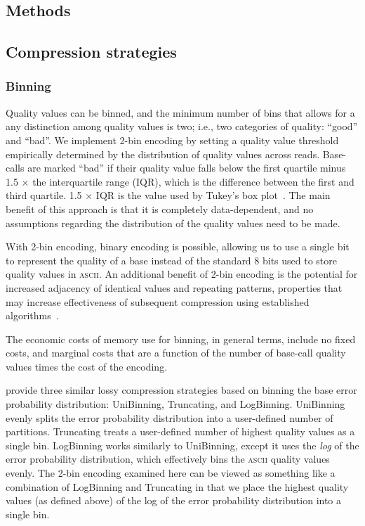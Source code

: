 \documentclass{bioinfo}
\begin{document}
\begin{methods}
\section{Methods}

\subsection{Compression strategies}

\subsubsection{Binning}

Quality values can be binned, and the minimum number of bins that
allows for a any distinction among quality values is two; i.e., two
categories of quality: ``good'' and ``bad''. We implement 2-bin
encoding by setting a quality value threshold empirically determined
by the distribution of quality values across reads. Base-calls are
marked ``bad'' if their quality value falls below the first quartile
minus 1.5 $\times$ the interquartile range (IQR), which is the
difference between the first and third quartile. 1.5 $\times$ IQR is
the value used by Tukey's box plot~\citep{mcgill1978variations}. The
main benefit of this approach is that it is completely data-dependent,
and no assumptions regarding the distribution of the quality values
need to be made.
 
With 2-bin encoding, binary encoding is possible, allowing us to use a
single bit to represent the quality of a base instead of the standard
8 bits used to store quality values in \textsc{ascii}. An additional
benefit of 2-bin encoding is the potential for increased adjacency of
identical values and repeating patterns, properties that may increase
effectiveness of subsequent compression using established
algorithms~\cite[e.g.,][]{HUFFMAN:1952nr,Ziv77auniversal,
  DBLP:journals/tit/ZivL78}.

The economic costs of memory use for binning, in general terms,
include no fixed costs, and marginal costs that are a function of the
number of base-call quality values times the cost of the encoding.

\cite{Wan:2012kq} provide three similar lossy compression strategies
based on binning the base error probability distribution: UniBinning,
Truncating, and LogBinning. UniBinning evenly splits the error
probability distribution into a user-defined number of partitions.
Truncating treats a user-defined number of highest quality values as a
single bin. LogBinning works similarly to UniBinning, except it uses
the \emph{log} of the error probability distribution, which
effectively bins the \textsc{ascii} quality values evenly. The 2-bin
encoding examined here can be viewed as something like a combination
of LogBinning and Truncating in that we place the highest quality
values (as defined above) of the log of the error probability
distribution into a single bin.


\end{methods}
\end{document}

